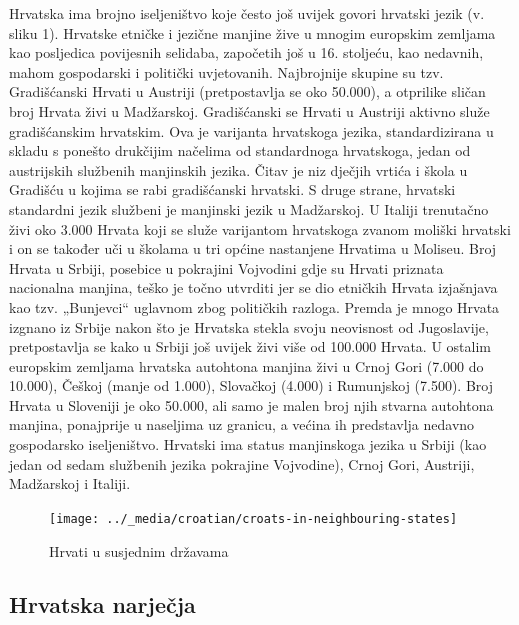 \begin{multicols}{2}
Hrvatska ima brojno iseljeništvo koje često još uvijek govori hrvatski jezik (v. sliku 1). Hrvatske etničke i jezične manjine žive u mnogim europskim zemljama kao posljedica povijesnih selidaba, započetih još u 16. stoljeću, kao nedavnih, mahom gospodarski i politički uvjetovanih. Najbrojnije skupine su tzv. Gradišćanski Hrvati u Austriji (pretpostavlja se oko 50.000), a otprilike sličan broj Hrvata živi u Madžarskoj. Gradišćanski se Hrvati u Austriji aktivno služe gradišćanskim hrvatskim. Ova je varijanta hrvatskoga jezika, standardizirana u skladu s ponešto drukčijim načelima od standardnoga hrvatskoga, jedan od austrijskih službenih manjinskih jezika. Čitav je niz dječjih vrtića i škola u Gradišću u kojima se rabi gradišćanski hrvatski. S druge strane, hrvatski standardni jezik službeni je manjinski jezik u Madžarskoj. U Italiji trenutačno živi oko 3.000 Hrvata koji se služe varijantom hrvatskoga zvanom moliški hrvatski i on se također uči u školama u tri općine nastanjene Hrvatima u Moliseu. Broj Hrvata u Srbiji, posebice u pokrajini Vojvodini gdje su Hrvati priznata nacionalna manjina, teško je točno utvrditi jer se dio etničkih Hrvata izjašnjava kao tzv. „Bunjevci“ uglavnom zbog političkih razloga. Premda je mnogo Hrvata izgnano iz Srbije nakon što je Hrvatska stekla svoju neovisnost od Jugoslavije, pretpostavlja se kako u Srbiji još uvijek živi više od 100.000 Hrvata. U ostalim europskim zemljama hrvatska autohtona manjina živi u Crnoj Gori (7.000 do 10.000), Češkoj (manje od 1.000), Slovačkoj (4.000) i Rumunjskoj (7.500). Broj Hrvata u Sloveniji je oko 50.000, ali samo je malen broj njih stvarna autohtona manjina, ponajprije u naseljima uz granicu, a većina ih predstavlja nedavno gospodarsko iseljeništvo. Hrvatski ima status manjinskoga jezika u Srbiji (kao jedan od sedam službenih jezika pokrajine Vojvodine), Crnoj Gori, Austriji, Madžarskoj i Italiji.

\begin{figure}[htb]
  \center
  \texttt{[image: ../\_media/croatian/croats-in-neighbouring-states]}
  \caption{Hrvati u susjednim državama \cite{boo2}}
  \label{fig:hrvati}
\end{figure}

\subsection{Hrvatska narječja}


\end{multicols}
